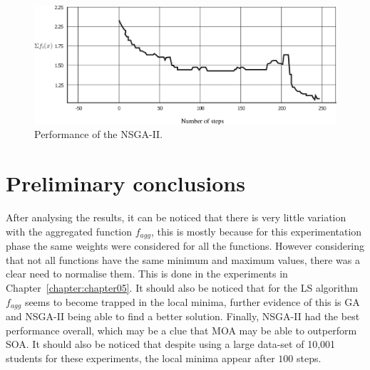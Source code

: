 \begin{figure}
    \centering
    \includegraphics[width=\textwidth]{images/multiobjective.png}
    \caption{Performance of the NSGA-II.}
    \label{fig:multiobjetivo}
\end{figure}

\section{Preliminary conclusions}

After analysing the results, it can be noticed that there is very little variation with the aggregated function $f_{agg}$, this is mostly because for this experimentation phase the same weights were considered for all the functions. However considering that not all functions have the same minimum and maximum values, there was a clear need to normalise them. This is done in the experiments in Chapter~\ref{chapter:chapter05}. It should also be noticed that for the LS algorithm $f_{agg}$ seems to become trapped in the local minima, further evidence of this is GA and NSGA-II being able to find a better solution. Finally, NSGA-II had the best performance overall, which may be a clue that MOA may be able to outperform SOA. It should also be noticed that despite using a large data-set of {10,001} students for these experiments, the local minima appear after $100$ steps.